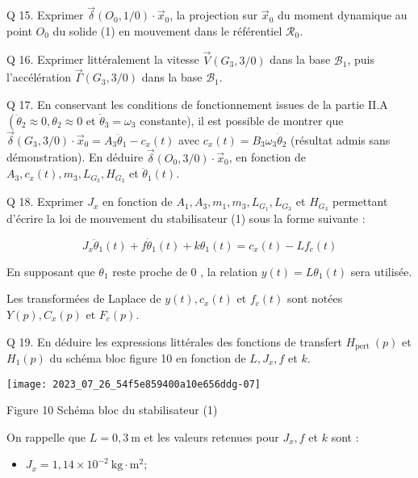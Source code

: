 Q 15. Exprimer $\vec{\delta}\left(O_{0}, 1 / 0\right) \cdot \vec{x}_{0}$, la projection sur $\vec{x}_{0}$ du moment dynamique au point $O_{0}$ du solide (1) en mouvement dans le référentiel $\mathcal{R}_{0}$.

Q 16. Exprimer littéralement la vitesse $\vec{V}\left(G_{3}, 3 / 0\right)$ dans la base $\mathcal{B}_{1}$, puis l'accélération $\vec{\Gamma}\left(G_{3}, 3 / 0\right)$ dans la base $\mathcal{B}_{1}$.

Q 17. En conservant les conditions de fonctionnement issues de la partie II.A $\left(\ddot{\theta}_{2} \approx 0, \theta_{2} \approx 0\right.$ et $\dot{\theta}_{3}=\omega_{3}$ constante), il est possible de montrer que $\vec{\delta}\left(G_{3}, 3 / 0\right) \cdot \vec{x}_{0}=A_{3} \ddot{\theta}_{1}-c_{x}(t)$ avec $c_{x}(t)=B_{3} \omega_{3} \dot{\theta}_{2}$ (résultat admis sans démonstration). En déduire $\vec{\delta}\left(O_{0}, 3 / 0\right) \cdot \vec{x}_{0}$, en fonction de $A_{3}, c_{x}(t), m_{3}, L_{G_{3}}, H_{G_{3}}$ et $\ddot{\theta}_{1}(t)$.

Q 18. Exprimer $J_{x}$ en fonction de $A_{1}, A_{3}, m_{1}, m_{3}, L_{G_{1}}, L_{G_{3}}$ et $H_{G_{3}}$ permettant d'écrire la loi de mouvement du stabilisateur (1) sous la forme suivante :

$$
J_{x} \ddot{\theta}_{1}(t)+f \dot{\theta}_{1}(t)+k \theta_{1}(t)=c_{x}(t)-L f_{c}(t)
$$

En supposant que $\theta_{1}$ reste proche de 0 , la relation $y(t)=L \theta_{1}(t)$ sera utilisée.

Les transformées de Laplace de $y(t), c_{x}(t)$ et $f_{c}(t)$ sont notées $Y(p), C_{x}(p)$ et $F_{c}(p)$.

Q 19. En déduire les expressions littérales des fonctions de transfert $H_{\text {pert }}(p)$ et $H_{1}(p)$ du schéma bloc figure 10 en fonction de $L, J_{x}, f$ et $k$.

\begin{center}
\texttt{[image: 2023\_07\_26\_54f5e859400a10e656ddg-07]}
\end{center}

Figure 10 Schéma bloc du stabilisateur (1)

On rappelle que $L=0,3 \mathrm{~m}$ et les valeurs retenues pour $J_{x}, f$ et $k$ sont :

\begin{itemize}
  \item $J_{x}=1,14 \times 10^{-2} \mathrm{~kg} \cdot \mathrm{m}^{2}$;
\end{itemize}

